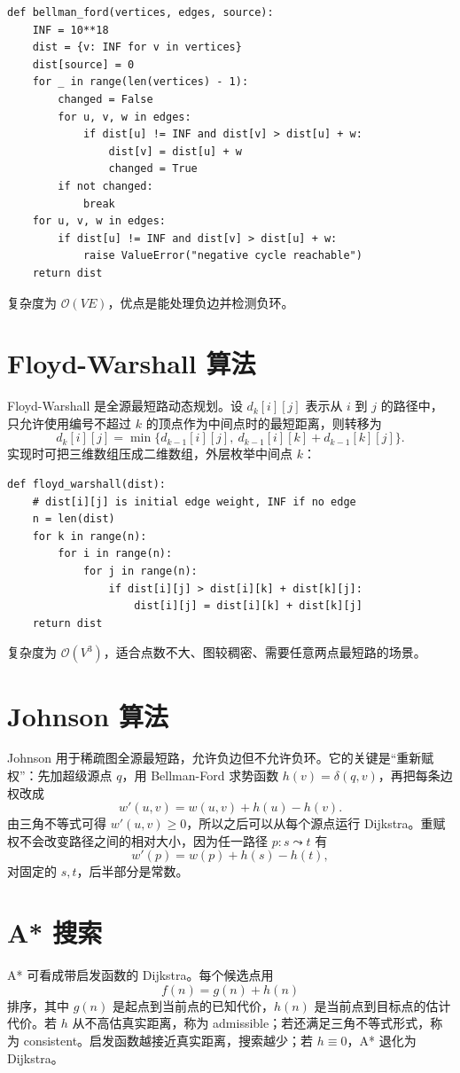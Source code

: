 \documentclass[UTF8,oneside,12pt]{ctexbook}
\newcommand{\bigO}{\mathcal O}
\begin{document}
\begin{lstlisting}
def bellman_ford(vertices, edges, source):
    INF = 10**18
    dist = {v: INF for v in vertices}
    dist[source] = 0
    for _ in range(len(vertices) - 1):
        changed = False
        for u, v, w in edges:
            if dist[u] != INF and dist[v] > dist[u] + w:
                dist[v] = dist[u] + w
                changed = True
        if not changed:
            break
    for u, v, w in edges:
        if dist[u] != INF and dist[v] > dist[u] + w:
            raise ValueError("negative cycle reachable")
    return dist
\end{lstlisting}
复杂度为 $\bigO(VE)$，优点是能处理负边并检测负环。

\section{Floyd-Warshall 算法}
Floyd-Warshall 是全源最短路动态规划。设 $d_k[i][j]$ 表示从 $i$ 到 $j$ 的路径中，只允许使用编号不超过 $k$ 的顶点作为中间点时的最短距离，则转移为
\[
d_k[i][j]=\min\{d_{k-1}[i][j],\ d_{k-1}[i][k]+d_{k-1}[k][j]\}.
\]
实现时可把三维数组压成二维数组，外层枚举中间点 $k$：
\begin{lstlisting}
def floyd_warshall(dist):
    # dist[i][j] is initial edge weight, INF if no edge
    n = len(dist)
    for k in range(n):
        for i in range(n):
            for j in range(n):
                if dist[i][j] > dist[i][k] + dist[k][j]:
                    dist[i][j] = dist[i][k] + dist[k][j]
    return dist
\end{lstlisting}
复杂度为 $\bigO(V^3)$，适合点数不大、图较稠密、需要任意两点最短路的场景。

\section{Johnson 算法}
Johnson 用于稀疏图全源最短路，允许负边但不允许负环。它的关键是“重新赋权”：先加超级源点 $q$，用 Bellman-Ford 求势函数 $h(v)=\delta(q,v)$，再把每条边权改成
\[
w'(u,v)=w(u,v)+h(u)-h(v).
\]
由三角不等式可得 $w'(u,v)\ge 0$，所以之后可以从每个源点运行 Dijkstra。重赋权不会改变路径之间的相对大小，因为任一路径 $p:s\leadsto t$ 有
\[
w'(p)=w(p)+h(s)-h(t),
\]
对固定的 $s,t$，后半部分是常数。

\section{A* 搜索}
A* 可看成带启发函数的 Dijkstra。每个候选点用
\[
f(n)=g(n)+h(n)
\]
排序，其中 $g(n)$ 是起点到当前点的已知代价，$h(n)$ 是当前点到目标点的估计代价。若 $h$ 从不高估真实距离，称为 admissible；若还满足三角不等式形式，称为 consistent。启发函数越接近真实距离，搜索越少；若 $h\equiv0$，A* 退化为 Dijkstra。
\end{document}
